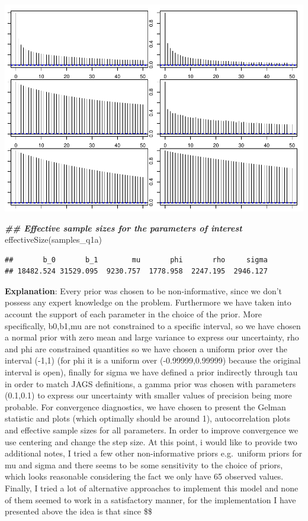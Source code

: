 \documentclass[
]{article}
\newenvironment{Shaded}{\begin{snugshade}}{\end{snugshade}}
\newcommand{\DocumentationTok}[1]{\textcolor[rgb]{0.56,0.35,0.01}{\textbf{\textit{#1}}}}
\newcommand{\FunctionTok}[1]{\textcolor[rgb]{0.00,0.00,0.00}{#1}}
\newcommand{\NormalTok}[1]{#1}
\begin{document}
\includegraphics{assignment-1_files/figure-latex/unnamed-chunk-9-1.pdf}

\begin{Shaded}
\begin{Highlighting}[]
\DocumentationTok{\#\# Effective sample sizes for the parameters of interest }
\FunctionTok{effectiveSize}\NormalTok{(samples\_q1a)}
\end{Highlighting}
\end{Shaded}

\begin{verbatim}
##       b_0       b_1        mu       phi       rho     sigma 
## 18482.524 31529.095  9230.757  1778.958  2247.195  2946.127
\end{verbatim}

\textbf{Explanation}: Every prior was chosen to be non-informative,
since we don't possess any expert knowledge on the problem. Furthermore
we have taken into account the support of each parameter in the choice
of the prior. More specifically, b0,b1,mu are not constrained to a
specific interval, so we have chosen a normal prior with zero mean and
large variance to express our uncertainty, rho and phi are constrained
quantities so we have chosen a uniform prior over the interval (-1,1)
(for phi it is a uniform over (-0.99999,0.99999) because the original
interval is open), finally for sigma we have defined a prior indirectly
through tau in order to match JAGS definitions, a gamma prior was chosen
with parameters (0.1,0.1) to express our uncertainty with smaller values
of precision being more probable. For convergence diagnostics, we have
chosen to present the Gelman statistic and plots (which optimally should
be around 1), autocorrelation plots and effective sample sizes for all
parameters. In order to improve convergence we use centering and change
the step size. At this point, i would like to provide two additional
notes, I tried a few other non-informative priors e.g.~uniform priors
for mu and sigma and there seems to be some sensitivity to the choice of
priors, which looks reasonable considering the fact we only have 65
observed values. Finally, I tried a lot of alternative approaches to
implement this model and none of them seemed to work in a satisfactory
manner, for the implementation I have presented above the idea is that
since \$\$
\end{document}

